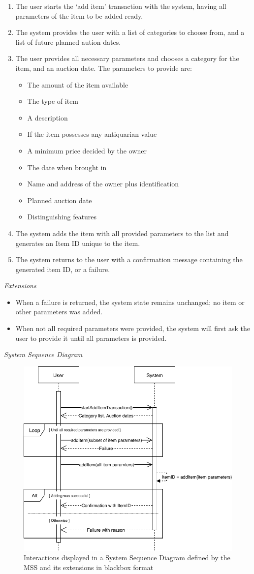 \begin{enumerate}[noitemsep]
	\item The user starts the `add item' transaction with the system, having all parameters of the item to be added ready.
	\item The system provides the user with a list of categories to choose from, and a list of future planned aution dates.
	\item The user provides all necessary parameters and chooses a category for the item, and an auction date. The parameters to provide are:
	\begin{itemize}[noitemsep]
		\item The amount of the item available
		\item The type of item
		\item A description
		\item If the item possesses any antiquarian value
		\item A minimum price decided by the owner
		\item The date when brought in
		\item Name and address of the owner plus identification
		\item Planned auction date
		\item Distinguishing features
	\end{itemize}
	\item The system adds the item with all provided parameters to the list and generates an Item ID unique to the item.
	\item The system returns to the user with a confirmation message containing the generated item ID, or a failure.
\end{enumerate}
\textsl{Extensions}
\begin{itemize}[noitemsep]
	\item When a failure is returned, the system state remains unchanged; no item or other parameters was added.
	\item When not all required parameters were provided, the system will first ask the user to provide it until all parameters is provided.
\end{itemize}
\textsl{System Sequence Diagram}
\begin{figure}[H]
	\centering
	\includegraphics[scale=1]{uml/SD-bb-create.pdf}
	\caption*{Interactions displayed in a System Sequence Diagram defined by the MSS and its extensions in blackbox format}
\end{figure}